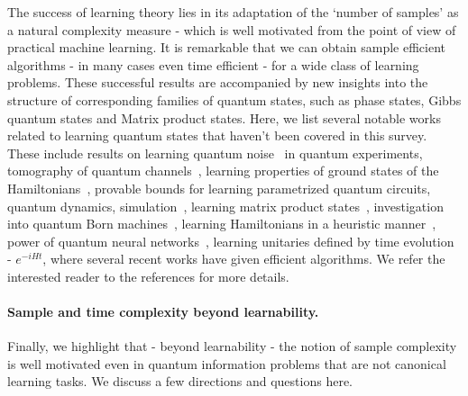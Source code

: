\documentclass[11pt]{article}
\begin{document}
The success of learning theory lies in its adaptation of the `number of samples' as a natural complexity measure - which is well motivated from the point of view of practical machine learning. It is remarkable that we can obtain sample efficient algorithms - in many cases even time efficient - for a wide class of learning problems. These successful results are accompanied by new insights into the structure of corresponding families of quantum states, such as phase states, Gibbs quantum states and Matrix product states. Here, we list several notable works related to learning quantum states that haven't been covered in this survey. These include results on learning quantum noise~\cite{flammia2012quantum} in quantum experiments, tomography of quantum channels~\cite{huang2022learning,caro2022learning,chung2018sample,caro2021binary,fanizza2022learning,caro2020pseudo,haah2023query}, learning properties of ground states of the Hamiltonians~\cite{lewis2023improved,onorati2023efficient,huang2022provably,rouze2021learning}, provable bounds for learning parametrized quantum circuits, quantum dynamics, simulation~\cite{caro2021encoding,caro2022generalization,gibbs2022dynamical,caro2022out}, learning matrix product states~\cite{cramer2010efficient,GSG2023,khavari2021lower}, investigation into quantum Born machines~\cite{CMDK20, ZGYN22, GYN22}, learning Hamiltonians in a heuristic manner~\cite{wiebe2014hamiltonian,wiebe2012quantum,verdon2019quantum}, power of quantum neural networks~\cite{abbas2021power,beer2020training}, learning unitaries defined by time evolution - $e^{-iHt}$, where several recent works \cite{WiebeGFC14,haah2021optimal,HTFS22,dutt2021active} have given efficient algorithms. We refer the interested reader to the references for more details. 

\paragraph{Sample and time complexity beyond learnability.} 
Finally, we highlight that - beyond learnability - the notion of sample complexity is well motivated even in quantum information problems that are not canonical learning tasks. We discuss a few directions and questions here.
\end{document}
